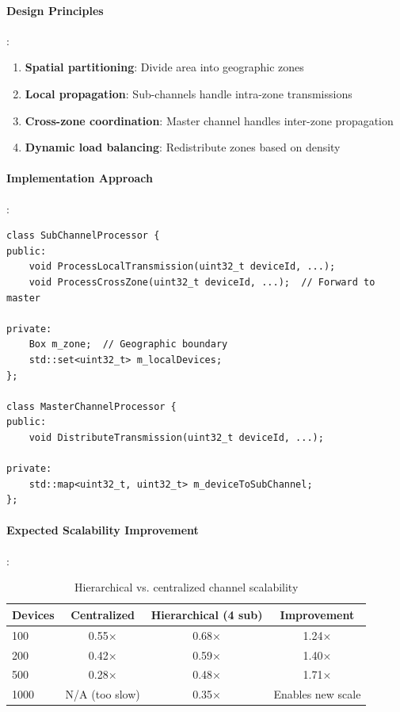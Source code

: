 \paragraph{Design Principles}:
\begin{enumerate}
    \item \textbf{Spatial partitioning}: Divide area into geographic zones
    \item \textbf{Local propagation}: Sub-channels handle intra-zone transmissions
    \item \textbf{Cross-zone coordination}: Master channel handles inter-zone propagation
    \item \textbf{Dynamic load balancing}: Redistribute zones based on density
\end{enumerate}

\paragraph{Implementation Approach}:
\begin{lstlisting}[style=cpp]
class SubChannelProcessor {
public:
    void ProcessLocalTransmission(uint32_t deviceId, ...);
    void ProcessCrossZone(uint32_t deviceId, ...);  // Forward to master
    
private:
    Box m_zone;  // Geographic boundary
    std::set<uint32_t> m_localDevices;
};

class MasterChannelProcessor {
public:
    void DistributeTransmission(uint32_t deviceId, ...);
    
private:
    std::map<uint32_t, uint32_t> m_deviceToSubChannel;
};
\end{lstlisting}

\paragraph{Expected Scalability Improvement}:
\begin{table}[htbp]
\centering
\caption{Hierarchical vs. centralized channel scalability}
\begin{tabular}{@{}lccc@{}}
\toprule
\textbf{Devices} & \textbf{Centralized} & \textbf{Hierarchical (4 sub)} & \textbf{Improvement} \\
\midrule
100 & 0.55× & 0.68× & 1.24× \\
200 & 0.42× & 0.59× & 1.40× \\
500 & 0.28× & 0.48× & 1.71× \\
1000 & N/A (too slow) & 0.35× & Enables new scale \\
\bottomrule
\end{tabular}
\end{table}

